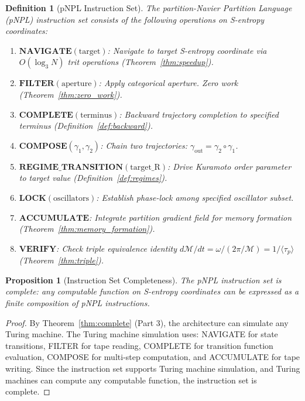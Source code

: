 \documentclass[twocolumn,10pt]{article}
\newtheorem{proposition}[theorem]{Proposition}
\newtheorem{definition}[theorem]{Definition}
\theoremstyle{remark}
\newcommand{\Depth}{\mathcal{M}}
\begin{document}
\begin{definition}[pNPL Instruction Set]
\label{def:instructions}
The partition-Navier Partition Language (pNPL) instruction set consists of the following operations on S-entropy coordinates:

\begin{enumerate}
\item $\mathbf{NAVIGATE}(\mathrm{target})$: Navigate to target S-entropy coordinate via $O(\log_3 N)$ trit operations (Theorem~\ref{thm:speedup}).
\item $\mathbf{FILTER}(\mathrm{aperture})$: Apply categorical aperture. Zero work (Theorem~\ref{thm:zero_work}).
\item $\mathbf{COMPLETE}(\mathrm{terminus})$: Backward trajectory completion to specified terminus (Definition~\ref{def:backward}).
\item $\mathbf{COMPOSE}(\gamma_1, \gamma_2)$: Chain two trajectories: $\gamma_{\mathrm{out}} = \gamma_2 \circ \gamma_1$.
\item $\mathbf{REGIME\_TRANSITION}(\mathrm{target\_R})$: Drive Kuramoto order parameter to target value (Definition~\ref{def:regimes}).
\item $\mathbf{LOCK}(\mathrm{oscillators})$: Establish phase-lock among specified oscillator subset.
\item $\mathbf{ACCUMULATE}$: Integrate partition gradient field for memory formation (Theorem~\ref{thm:memory_formation}).
\item $\mathbf{VERIFY}$: Check triple equivalence identity $d\Depth/dt = \omega/(2\pi/\Depth) = 1/\langle\tau_p\rangle$ (Theorem~\ref{thm:triple}).
\end{enumerate}
\end{definition}

\begin{proposition}[Instruction Set Completeness]
\label{prop:isa_complete}
The pNPL instruction set is complete: any computable function on S-entropy coordinates can be expressed as a finite composition of pNPL instructions.
\end{proposition}

\begin{proof}
By Theorem~\ref{thm:complete} (Part 3), the architecture can simulate any Turing machine. The Turing machine simulation uses: NAVIGATE for state transitions, FILTER for tape reading, COMPLETE for transition function evaluation, COMPOSE for multi-step computation, and ACCUMULATE for tape writing. Since the instruction set supports Turing machine simulation, and Turing machines can compute any computable function, the instruction set is complete.
\end{proof}
\end{document}
